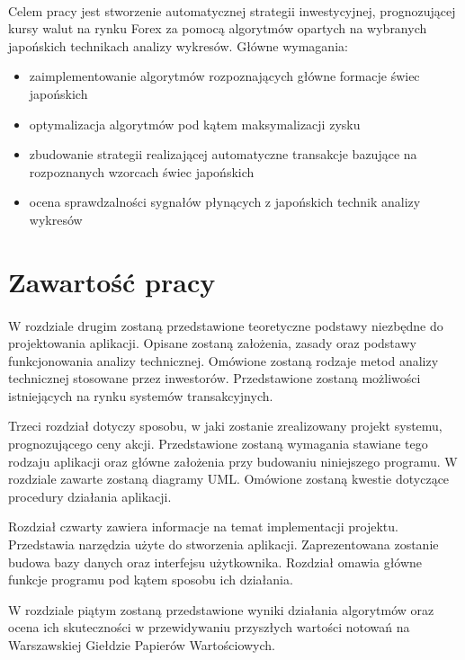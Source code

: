\documentclass[pdflatex,11pt]{aghdpl}
\begin{document}
\paragraph{}
Celem pracy jest stworzenie automatycznej strategii inwestycyjnej, prognozującej kursy walut na rynku Forex za pomocą algorytmów opartych na wybranych japońskich technikach analizy wykresów. Główne wymagania:
\begin{itemize}
\item
zaimplementowanie algorytmów rozpoznających główne formacje świec japońskich
\item
optymalizacja algorytmów pod kątem maksymalizacji zysku
\item
zbudowanie strategii realizającej automatyczne transakcje bazujące na rozpoznanych wzorcach świec japońskich
\item
ocena sprawdzalności sygnałów płynących z japońskich technik analizy wykresów
\end{itemize}
\section{Zawartość pracy}
\paragraph{}
W rozdziale drugim zostaną przedstawione teoretyczne podstawy niezbędne do projektowania aplikacji. Opisane zostaną założenia, zasady oraz podstawy funkcjonowania analizy technicznej. Omówione zostaną rodzaje metod analizy technicznej stosowane przez inwestorów. Przedstawione zostaną możliwości istniejących na rynku systemów transakcyjnych.

Trzeci rozdział dotyczy sposobu, w jaki zostanie zrealizowany projekt systemu, prognozującego ceny akcji. Przedstawione zostaną wymagania stawiane tego rodzaju aplikacji oraz główne założenia przy budowaniu niniejszego programu. W rozdziale zawarte zostaną diagramy UML. Omówione zostaną kwestie dotyczące procedury działania aplikacji.

Rozdział czwarty zawiera informacje na temat implementacji projektu. Przedstawia narzędzia użyte do stworzenia aplikacji. Zaprezentowana zostanie budowa bazy danych oraz interfejsu użytkownika. Rozdział omawia główne funkcje programu pod kątem sposobu ich działania.

W rozdziale piątym zostaną przedstawione wyniki działania algorytmów oraz ocena ich skuteczności w przewidywaniu przyszłych wartości notowań na Warszawskiej Giełdzie Papierów Wartościowych.  
\end{document}

